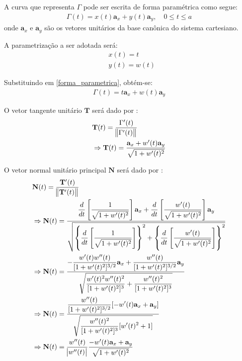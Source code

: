 A curva que representa $\Gamma$ pode ser escrita de forma paramétrica como segue:
\begin{align}
\Gamma(t) = x(t) \mathbf{a}_x + y(t) \mathbf{a}_y, \quad 0 \le t \le a \label{forma_parametrica}
\end{align}
onde $\mathbf{a}_x$ e $\mathbf{a}_y$ são os vetores unitários da base canônica do sistema cartesiano.

A parametrização a ser adotada será:
\begin{align}
& x(t) = t \label{parametrizacao_x}\\
& y(t) = w(t) \label{parametrizacao_y}
\end{align}

Substituindo em \eqref{forma_parametrica}, obtém-se:
\begin{align}
\Gamma(t) = t \mathbf{a}_x + w(t) \mathbf{a}_y \label{forma_parametrica_substituida}
\end{align}

O vetor tangente unitário $\mathbf{T}$ será dado por \citep{livro_stewart}:
\begin{align}
& \mathbf{T}(t) = \frac{\Gamma'(t)}{\norm{\Gamma'(t)}} \nonumber \\
& \Rightarrow \mathbf{T}(t) = \frac{\mathbf{a}_x + w'(t) \mathbf{a}_y}{\sqrt{1 + w'(t)^2}}
\end{align}

O vetor normal unitário principal $\mathbf{N}$ será dado por \citep{livro_stewart}:
\begin{align}
& \mathbf{N}(t) = \frac{\mathbf{T}'(t)}{\norm{\mathbf{T}'(t)}} \nonumber \\
& \Rightarrow \mathbf{N}(t) = \frac{ \displaystyle\frac{d}{dt}\left[\frac{1}{\sqrt{1 + w'(t)^2}}\right]\mathbf{a}_x
	+
	\displaystyle\frac{d}{dt}\left[\frac{w'(t)}{\sqrt{1 + w'(t)^2}}\right]\mathbf{a}_y }
{\sqrt{ \left\lbrace \displaystyle\frac{d}{dt}\left[\frac{1}{\sqrt{1 + w'(t)^2}}\right] \right\rbrace ^2
		+
		\left\lbrace \displaystyle\frac{d}{dt}\left[\frac{w'(t)}{\sqrt{1 + w'(t)^2}}\right] \right\rbrace ^2 }} \nonumber \\
& \Rightarrow \mathbf{N}(t) = \frac{ -\displaystyle \frac{w'(t)w''(t)}{[1 + w'(t)^2]^{3/2}} \mathbf{a}_x
	+
	\displaystyle \frac{w''(t)}{[1 + w'(t)^2]^{3/2}} \mathbf{a}_y }
{\sqrt{ \displaystyle \frac{w'(t)^2 w''(t)^2}{[1 + w'(t)^2]^3} 
		+
		\displaystyle \frac{w''(t)^2}{[1 + w'(t)^2]^{3}} }} \nonumber \\
& \Rightarrow \mathbf{N}(t) = \frac{ \displaystyle\frac{w''(t)}{[1 + w'(t)^2]^{3/2}} [-w'(t)\mathbf{a}_x + \mathbf{a}_y] }
{\sqrt{ \displaystyle \frac{w''(t)^2}{[1 + w'(t)^2]^3} [w'(t)^2	+ 1] }} \nonumber \\
& \Rightarrow \mathbf{N}(t) = \frac{w''(t)}{\abs{w''(t)}} \frac{ -w'(t)\mathbf{a}_x + \mathbf{a}_y }
{\sqrt{ 1 + w'(t)^2 }} \label{equacao_normal_geometria_diferencial}
\end{align}

